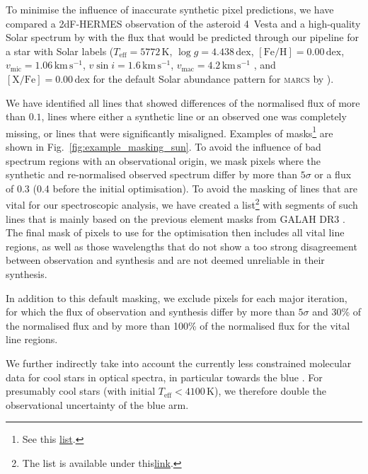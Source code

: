 \documentclass[
  journal=pasa,
  manuscript=research-paper, %
  year=2023,
  volume=37
]{cup-journal}
\newcommand{\marcs}{\textsc{marcs}\xspace}
\newcommand{\dex}{\,\mathrm{dex}}	%
\newcommand{\K}{\,\mathrm{K}}	%
\newcommand{\kms}{\,\mathrm{km\,s^{-1}}}	%
\begin{document}
To minimise the influence of inaccurate synthetic pixel predictions, we have compared a 2dF-HERMES observation of the asteroid 4~Vesta and a high-quality Solar spectrum by \citet{Hinkle2000} with the flux that would be predicted through our pipeline for a star with Solar labels ($T_\text{eff} = 5772\K$, $\log g = 4.438\dex$, $\mathrm{[Fe/H]} = 0.00\dex$, $v_\text{mic} = 1.06\kms$, $v \sin i = 1.6\kms$, $v_\text{mac} = 4.2\kms$ \citep{Prsa2016, Jofre2017}, and $\mathrm{[X/Fe]} = 0.00\dex$ for the default Solar abundance pattern for \marcs by \citet{Grevesse2007}).

We have identified all lines that showed differences of the normalised flux of more than $0.1$, lines where either a synthetic line or an observed one was completely missing, or lines that were significantly misaligned. Examples of masks\footnote{See this \href{https://github.com/svenbuder/GALAH_DR4/blob/main/spectrum_analysis/spectrum_masks/solar_spectrum_mask.fits}{list}.} are shown in Fig.~\ref{fig:example_masking_sun}. To avoid the influence of bad spectrum regions with an observational origin, we mask pixels where the synthetic and re-normalised observed spectrum differ by more than $5\sigma$ or a flux of 0.3 (0.4 before the initial optimisation). To avoid the masking of lines that are vital for our spectroscopic analysis, we have created a list\footnote{The list is available under this\href{https://github.com/svenbuder/GALAH_DR4/blob/main/spectrum_analysis/spectrum_masks/vital_lines.fits}{link}.}  with segments of such lines that is mainly based on the previous element masks from GALAH DR3 \citep{Buder2021}. The final mask of pixels to use for the optimisation then includes all vital line regions, as well as those wavelengths that do not show a too strong disagreement between observation and synthesis and are not deemed unreliable in their synthesis.

In addition to this default masking, we exclude pixels for each major iteration, for which the flux of observation and synthesis differ by more than $5 \sigma$ and 30\% of the normalised flux and by more than 100\% of the normalised flux for the vital line regions.

We further indirectly take into account the currently less constrained molecular data for cool stars in optical spectra, in particular towards the blue \citep[e.g.][]{Rains2021}. For presumably cool stars (with initial $T_\text{eff} < 4100\,\mathrm{K}$), we therefore double the observational uncertainty of the blue arm.
\end{document}
